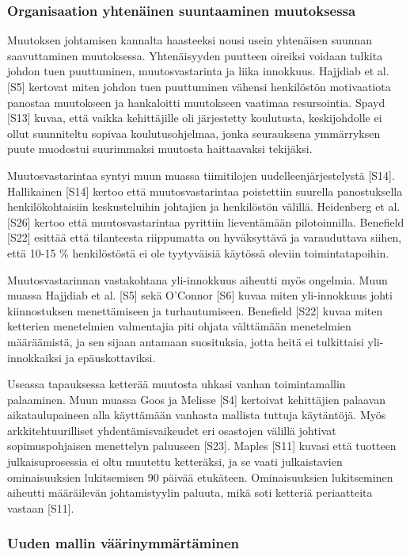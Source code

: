 \subsubsection{Organisaation yhtenäinen suuntaaminen muutoksessa}

Muutoksen johtamisen kannalta haasteeksi nousi usein yhtenäisen suunnan
saavuttaminen muutoksessa. Yhtenäisyyden puutteen oireiksi voidaan tulkita
johdon tuen puuttuminen, muutosvastarinta ja liika innokkuus. Hajjdiab et al.
[S5] kertovat miten johdon tuen puuttuminen vähensi henkilöstön motivaatiota
panostaa muutokseen ja hankaloitti muutokseen vaatimaa resursointia. Spayd [S13]
kuvaa, että vaikka kehittäjille oli järjestetty koulutusta, keskijohdolle ei
ollut suunniteltu sopivaa koulutusohjelmaa, jonka seurauksena ymmärryksen
puute muodostui suurimmaksi muutosta haittaavaksi tekijäksi.

Muutosvastarintaa syntyi muun muassa tiimitilojen uudelleenjärjestelystä [S14].
Hallikainen [S14] kertoo että muutosvastarintaa poistettiin suurella
panostuksella henkilökohtaisiin keskusteluihin johtajien ja henkilöstön välillä.
Heidenberg et al. [S26] kertoo että muutosvastarintaa pyrittiin lieventämään
pilotoinnilla. Benefield [S22] esittää että tilanteesta riippumatta on
hyväksyttävä ja varauduttava siihen, että 10-15 \% henkilöstöstä ei ole
tyytyväisiä käytössä oleviin toimintatapoihin.

Muutosvastarinnan vastakohtana yli-innokkuus aiheutti myös ongelmia. Muun muassa
Hajjdiab et al. [S5] sekä O'Connor [S6] kuvaa miten yli-innokkuus johti 
kiinnostuksen menettämiseen ja turhautumiseen. Benefield [S22] kuvaa miten
ketterien menetelmien valmentajia piti ohjata välttämään menetelmien
määräämistä, ja sen sijaan antamaan suosituksia, jotta heitä ei tulkittaisi
yli-innokkaiksi ja epäuskottaviksi.

Useassa tapauksessa ketterää muutosta uhkasi vanhan toimintamallin palaaminen.
Muun muassa Goos ja Melisse [S4] kertoivat kehittäjien palaavan
aikataulupaineen alla käyttämään vanhasta mallista tuttuja käytäntöjä. Myös
arkkitehtuurilliset yhdentämisvaikeudet eri osastojen välillä johtivat
sopimuspohjaisen menettelyn paluuseen [S23]. Maples [S11] kuvasi että tuotteen
julkaisuprosessia ei oltu muutettu ketteräksi, ja se vaati julkaistavien
ominaisuuksien lukitsemisen 90 päivää etukäteen. Ominaisuuksien lukitseminen
aiheutti määräilevän johtamistyylin paluuta, mikä soti ketteriä periaatteita
vastaan [S11].

\subsubsection{Uuden mallin väärinymmärtäminen}

